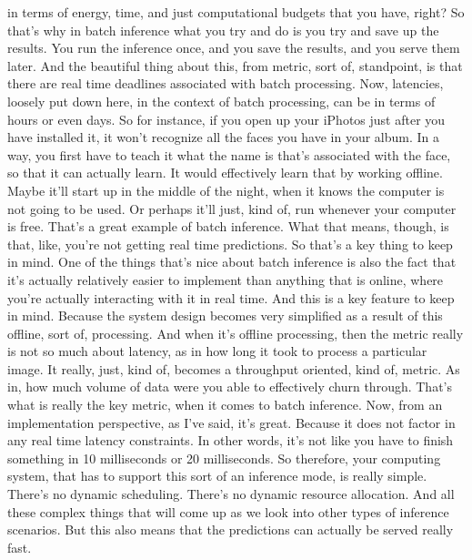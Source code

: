 {{{{{{{    in terms of energy, time, and just computational budgets that you have,
    right?
    So that's why in batch inference what you try and do
    is you try and save up the results.
    You run the inference once, and you save the results, and you serve them later.
    And the beautiful thing about this, from metric, sort of,
    standpoint, is that there are real time deadlines associated
    with batch processing.
    Now, latencies, loosely put down here, in the context of batch processing,
    can be in terms of hours or even days.
    So for instance, if you open up your iPhotos
    just after you have installed it, it won't recognize
    all the faces you have in your album.
    In a way, you first have to teach it what
    the name is that's associated with the face, so that it can actually learn.
    It would effectively learn that by working offline.
    Maybe it'll start up in the middle of the night, when it knows
    the computer is not going to be used.
    Or perhaps it'll just, kind of, run whenever your computer is free.
    That's a great example of batch inference.
    What that means, though, is that, like, you're
    not getting real time predictions.
    So that's a key thing to keep in mind.
    One of the things that's nice about batch inference
    is also the fact that it's actually relatively easier
    to implement than anything that is online,
    where you're actually interacting with it in real time.
    And this is a key feature to keep in mind.
    Because the system design becomes very simplified as a result of this offline,
    sort of, processing.
    And when it's offline processing, then the metric really
    is not so much about latency, as in how long
    it took to process a particular image.
    It really, just, kind of, becomes a throughput oriented, kind of, metric.
    As in, how much volume of data were you able to effectively churn through.
    That's what is really the key metric, when it comes to batch inference.
    Now, from an implementation perspective, as I've said, it's great.
    Because it does not factor in any real time latency constraints.
    In other words, it's not like you have to finish something
    in 10 milliseconds or 20 milliseconds.
    So therefore, your computing system, that
    has to support this sort of an inference mode, is really simple.
    There's no dynamic scheduling.
    There's no dynamic resource allocation.
    And all these complex things that will come up
    as we look into other types of inference scenarios.
    But this also means that the predictions can actually be served really fast.
}}}}}}}
